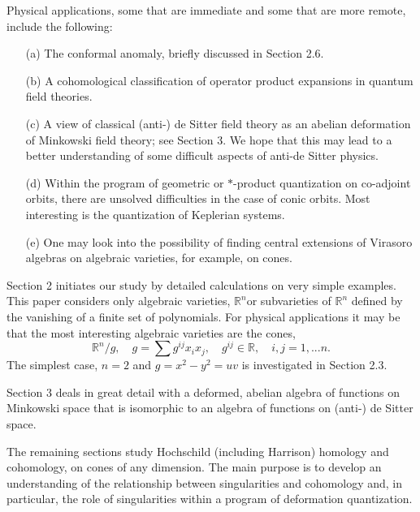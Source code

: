 \documentclass[a4paper,a4paper]{article}
\begin{document}
\smallskip

Physical applications, some that are immediate and some that are more
remote, include the following:
\begin{itemize}
\item[(a)] The conformal anomaly, briefly discussed in Section 2.6.
\vspace*{-2.2mm}

\item[(b)] A cohomological classification of operator product expansions
in quantum field theories.
\vspace*{-2.2mm}

\item[(c)] A view of classical (anti-) de Sitter field theory as an abelian
deformation of Min\-kowski field theory; see Section 3.  We hope that this
may lead to a better understanding of some difficult aspects of anti-de
Sitter physics.
\vspace*{-2.2mm}

\item[(d)] Within the program of geometric  or $*$-product quantization on
co-adjoint orbits, there are unsolved difficulties in the case of conic
orbits. Most interesting is the quantization of Keplerian systems.
\vspace*{-2.2mm}

\item[(e)] One may look into the possibility of finding central extensions of
Virasoro algebras on algebraic varieties,  for example, on cones.
\end{itemize}

Section 2 initiates our study by detailed calculations on very simple
examples.  This paper considers only algebraic varieties, $\mathbb{R}^n
$or subvarieties of $\mathbb{R}^n$ defined by the vanishing of a finite set
of polynomials. For physical applications it may be that the most
interesting algebraic varieties are the cones,
$$
\mathbb{R}^n/g,\quad g = \sum g^{ij}x_ix_j,\quad g^{ij} \in \mathbb{R},
\quad i,j =1,...n. 
$$
The simplest case, $n = 2$ and $g = x^2-y^2 = uv$ is investigated in
Section 2.3. 

Section 3 deals in great detail with a deformed, abelian algebra of
functions on Min\-kowski space that is isomorphic to an algebra of
functions on (anti-) de Sitter space.

The remaining sections study Hochschild (including Harrison) homology 
and cohomology,  on cones of any dimension. The main purpose is to develop an
understanding of the relationship between singularities and cohomology
and, in particular, the role of singularities within a program of
deformation quantization.
\end{document}
